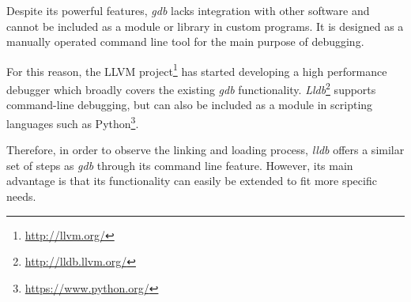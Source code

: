 Despite its powerful features, \textit{gdb} lacks integration with other software and cannot be included as a module or library in custom programs. It is designed as a manually operated command line tool for the main purpose of debugging.

For this reason, the LLVM project\footnote{\url{http://llvm.org/}} has started developing a high performance debugger which broadly covers the existing \textit{gdb} functionality. \textit{Lldb}\footnote{\url{http://lldb.llvm.org/}} supports command-line debugging, but can also be included as a module in scripting languages such as Python\footnote{\url{https://www.python.org/}}.

Therefore, in order to observe the linking and loading process, \textit{lldb} offers a similar set of steps as \textit{gdb} through its command line feature. However, its main advantage is that its functionality can easily be extended to fit more specific needs.
